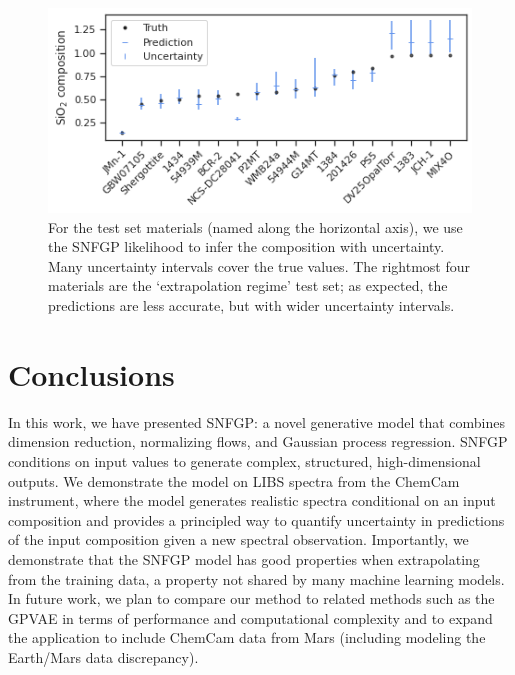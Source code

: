\documentclass[letterpaper]{article} %
\begin{document}
\begin{figure}
    \centering
    \includegraphics[width=\linewidth]{figures/compmle.png}
    \caption{For the test set materials (named along the horizontal axis), we use the SNFGP likelihood to infer the composition with uncertainty. Many uncertainty intervals cover the true values. The rightmost four materials are the `extrapolation regime' test set; as expected, the predictions are less accurate, but with wider uncertainty intervals.}
    \label{fig:compmle}
\end{figure}

\section{Conclusions}
In this work, we have presented SNFGP: a novel generative model that combines dimension reduction, normalizing flows, and Gaussian process regression.
SNFGP conditions on input values to generate complex, structured, high-dimensional outputs.
We demonstrate the model on LIBS spectra from the ChemCam instrument, where the model generates realistic spectra conditional on an input composition and provides a principled way to quantify uncertainty in predictions of the input composition given a new spectral observation.
Importantly, we demonstrate that the SNFGP model has good properties when extrapolating from the training data, a property not shared by many machine learning models.
In future work, we plan to compare our method to related methods such as the GPVAE in terms of performance and computational complexity and to expand the application to include ChemCam data from Mars (including modeling the Earth/Mars data discrepancy).

\end{document}
